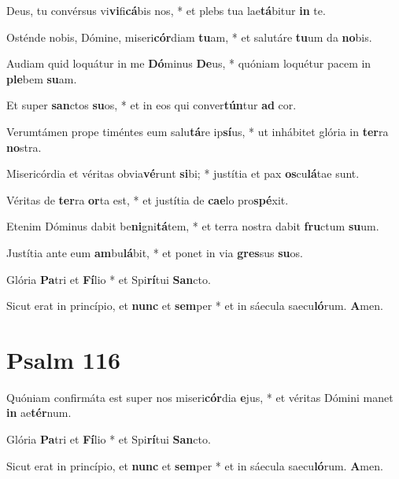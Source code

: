 \documentclass[a5paper, 12pt]{article}
\begin{document}
Deus, tu convérsus vi\textbf{vi}fi\textbf{cá}bis nos, * et plebs tua lae\textbf{tá}bitur \textbf{in} te. 

Osténde nobis, Dómine, miseri\textbf{cór}diam \textbf{tu}am, * et salutáre \textbf{tu}um da \textbf{no}bis. 

Audiam quid loquátur in me \textbf{Dó}minus \textbf{De}us, * quóniam loquétur pacem in \textbf{ple}bem \textbf{su}am.

Et super \textbf{san}ctos \textbf{su}os, * et in eos qui conver\textbf{tún}tur \textbf{ad} cor. 

Verumtámen prope timéntes eum salu\textbf{tá}re ip\textbf{sí}us, * ut inhábitet glória in \textbf{ter}ra \textbf{no}stra. 

Misericórdia et véritas obvia\textbf{vé}runt \textbf{si}bi; * justítia et pax \textbf{os}cu\textbf{lá}tae sunt. 

Véritas de \textbf{ter}ra \textbf{or}ta est, * et justítia de \textbf{cae}lo pro\textbf{spé}xit. 

Etenim Dóminus dabit be\textbf{ni}gni\textbf{tá}tem, * et terra nostra dabit \textbf{fru}ctum \textbf{su}um. 

Justítia ante eum \textbf{am}bu\textbf{lá}bit, * et ponet in via \textbf{gres}sus \textbf{su}os.

Glória \textbf{Pa}tri et \textbf{Fí}lio * et Spi\textbf{rí}tui \textbf{San}cto.

Sicut erat in princípio, et \textbf{nunc} et \textbf{sem}per * et in sáecula saecu\textbf{ló}rum. \textbf{A}men.




\section{Psalm 116}



Quóniam confirmáta est super nos miseri\textbf{cór}dia \textbf{e}jus, * et véritas Dómini manet \textbf{in} ae\textbf{tér}num.

Glória \textbf{Pa}tri et \textbf{Fí}lio * et Spi\textbf{rí}tui \textbf{San}cto.

Sicut erat in princípio, et \textbf{nunc} et \textbf{sem}per * et in sáecula saecu\textbf{ló}rum. \textbf{A}men.
\end{document}
